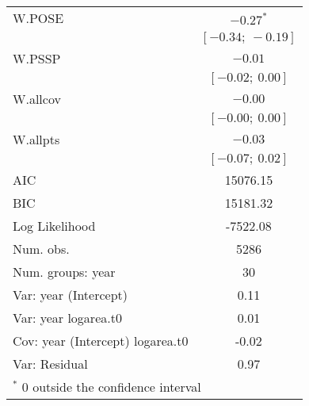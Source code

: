 \documentclass[11pt]{article}
\begin{document}
\begin{table}
\begin{center}
\begin{tabular}{l c }
W.POSE                           & $-0.27^{*}$       \\
                                 & $[-0.34;\ -0.19]$ \\
W.PSSP                           & $-0.01$           \\
                                 & $[-0.02;\ 0.00]$  \\
W.allcov                         & $-0.00$           \\
                                 & $[-0.00;\ 0.00]$  \\
W.allpts                         & $-0.03$           \\
                                 & $[-0.07;\ 0.02]$  \\
\hline
AIC                              & 15076.15          \\
BIC                              & 15181.32          \\
Log Likelihood                   & -7522.08          \\
Num. obs.                        & 5286              \\
Num. groups: year                & 30                \\
Var: year (Intercept)            & 0.11              \\
Var: year logarea.t0             & 0.01              \\
Cov: year (Intercept) logarea.t0 & -0.02             \\
Var: Residual                    & 0.97              \\
\hline
\multicolumn{2}{l}{\scriptsize{$^*$ 0 outside the confidence interval}}
\end{tabular}
\label{table:POSEgrowth-byYr}
\end{center}
\end{table}
\end{document}

